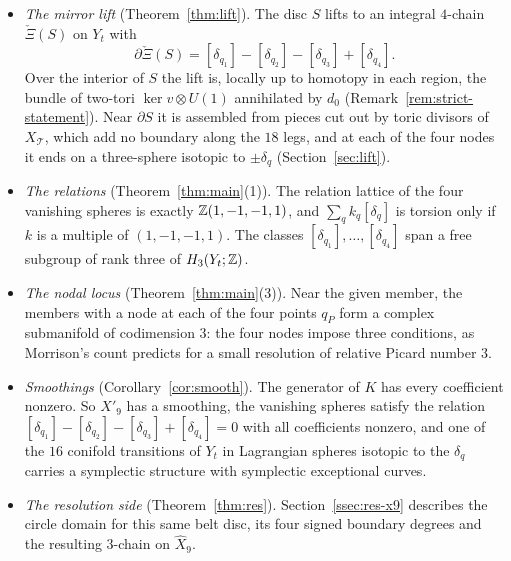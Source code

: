 \begin{itemize}
\item \emph{The mirror lift} (Theorem~\ref{thm:lift}). The disc $S$ lifts to an integral $4$-chain $\check\Xi(S)$ on $Y_t$
with
\[
\partial\check\Xi(S)=[\delta_{q_1}]-[\delta_{q_2}]-[\delta_{q_3}]+[\delta_{q_4}].
\]
Over the interior of $S$ the lift is, locally up to homotopy in each region, the bundle of two-tori
$\ker v\otimes U(1)$ annihilated by $d_0$ (Remark~\ref{rem:strict-statement}). Near $\partial S$ it
is assembled from pieces cut out by toric divisors of $X_{\mathcal T}$, which add no boundary along the $18$ legs, and at
each of the four nodes it ends on a three-sphere isotopic to $\pm\delta_q$ (Section~\ref{sec:lift}).
\item \emph{The relations} (Theorem~\ref{thm:main}(1)). The relation lattice of the four vanishing spheres is exactly
$\mathbb Z(1,-1,-1,1)$, and $\sum_qk_q[\delta_q]$ is torsion only if $k$ is a multiple of $(1,-1,-1,1)$. The classes
$[\delta_{q_1}],\dots,[\delta_{q_4}]$ span a free subgroup of rank three of $H_3(Y_t;\mathbb Z)$.
\item \emph{The nodal locus} (Theorem~\ref{thm:main}(3)). Near the given member, the members with a node at each of the
four points $q_P$ form a complex submanifold of codimension $3$: the four nodes impose three conditions, as Morrison's
count predicts for a small resolution of relative Picard number $3$.
\item \emph{Smoothings} (Corollary~\ref{cor:smooth}). The generator of $K$ has every coefficient nonzero. So $X'_9$ has a
smoothing, the vanishing spheres satisfy the relation $[\delta_{q_1}]-[\delta_{q_2}]-[\delta_{q_3}]+[\delta_{q_4}]=0$ with
all coefficients nonzero, and one of the $16$ conifold transitions of $Y_t$ in Lagrangian spheres isotopic to the
$\delta_q$ carries a symplectic structure with symplectic exceptional curves.
\item \emph{The resolution side} (Theorem~\ref{thm:res}). Section~\ref{ssec:res-x9} describes the circle domain for this
same belt disc, its four signed boundary degrees and the resulting $3$-chain on $\widehat X_9$.
\end{itemize}

